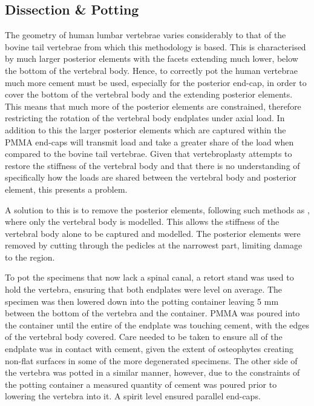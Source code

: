 \subsection{Dissection \& Potting}

The geometry of human lumbar vertebrae varies considerably to that of the
bovine
tail vertebrae from which this methodology is based. This is characterised by
much larger posterior elements with the facets extending much lower, below the
bottom of the vertebral body. Hence, to correctly pot the human vertebrae much
more cement must be used, especially for the posterior end-cap, in order to
cover the bottom of the vertebral body and the extending posterior elements.
This means that much more of the posterior elements are constrained, therefore
restricting the rotation of the vertebral body endplates under axial load. In
addition to this the larger posterior elements which are captured within the
PMMA end-caps will transmit load and take a greater share of the load when
compared to the bovine tail vertebrae. Given that vertebroplasty attempts to
restore the stiffness of the vertebral body and that there is no understanding
of specifically how the loads are shared between the vertebral body and
posterior element, this presents a problem.

A solution to this is to remove the posterior elements, following such methods
as \cite{Wijayathunga2008,RobsonBrown2014}, where only the vertebral body is
modelled. This allows the stiffness of the vertebral body alone to be captured
and modelled. The posterior elements were removed by cutting through the
pedicles at the narrowest part, limiting damage to the region.

To pot the specimens that now lack a spinal canal, a retort stand was used to
hold the vertebra, ensuring that both endplates were level on average. The
specimen was then lowered down into the potting container leaving 5 mm between
the bottom of the vertebra and the container. PMMA was poured into the
container
until the entire of the endplate was touching cement, with the edges of the
vertebral body covered. Care needed to be taken to ensure all of the endplate
was in contact with cement, given the extent of osteophytes creating non-flat
surfaces in some of the more degenerated specimens. The other side of the
vertebra was potted in a similar manner, however, due to the constraints of the
potting container a measured quantity of cement was poured prior to lowering
the
vertebra into it. A spirit level ensured parallel end-caps.

